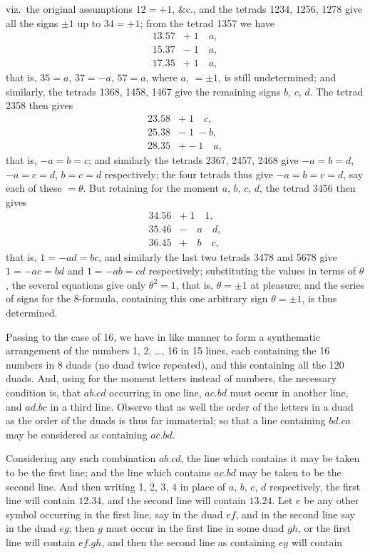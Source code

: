 \documentclass[11pt,a4paper,english]{article}
\theoremstyle{plain}
\begin{document}
\newpage
viz.\ the original assumptions $12 = +1$, \&c., and the tetrads 1234, 1256, 1278 give all the signs $\pm 1$ up to $34 = +1$; from the tetrad 1357 we have
\begin{align*}
13.57 &+ \; 1 \quad a, \\
15.37 &- \; 1 \quad a, \\
17.35 &+ \; 1 \quad a,
\end{align*}
that is, $35 = a$, $37 = -a$, $57 = a$, where $a$, $= \pm 1$, is still undetermined; and similarly, the tetrads 1368, 1458, 1467 give the remaining signs $b$, $c$, $d$. The tetrad 2358 then gives
\begin{align*}
23.58 &+ \; 1 \quad c, \\
25.38 &- \; 1 \; -b, \\
28.35 &+ -1 \quad a,
\end{align*}
that is, $-a = b = c$; and similarly the tetrads 2367, 2457, 2468 give $-a = b = d$, $-a = c = d$, $b = c = d$ respectively; the four tetrads thus give $-a = b = c = d$, say each of these $= \theta$. But retaining for the moment $a$, $b$, $c$, $d$, the tetrad 3456 then gives
\begin{align*}
34.56 &+ \; 1 \quad 1, \\
35.46 &- \quad a \quad d, \\
36.45 &+ \quad b \quad c,
\end{align*}
that is, $1 = -ad = bc$, and similarly the last two tetrads 3478 and 5678 give $1 = -ac = bd$ and $1 = -ab = cd$ respectively; substituting the values in terms of $\theta$, the several equations give only $\theta^2 = 1$, that is, $\theta = \pm 1$ at pleasure; and the series of signs for the 8-formula, containing this one arbitrary sign $\theta = \pm 1$, is thus determined.

Passing to the case of 16, we have in like manner to form a synthematic arrangement of the numbers 1, 2, \ldots, 16 in 15 lines, each containing the 16 numbers in 8 duads (no duad twice repeated), and this containing all the 120 duads. And, using for the moment letters instead of numbers, the necessary condition is, that $ab.cd$ occurring in one line, $ac.bd$ must occur in another line, and $ad.bc$ in a third line. Observe that as well the order of the letters in a duad as the order of the duads is thus far immaterial; so that a line containing $bd.ca$ may be considered as containing $ac.bd$.

Considering any such combination $ab.cd$, the line which contains it may be taken to be the first line; and the line which contains $ac.bd$ may be taken to be the second line. And then writing 1, 2, 3, 4 in place of $a$, $b$, $c$, $d$ respectively, the first line will contain $12.34$, and the second line will contain $13.24$. Let $e$ be any other symbol occurring in the first line, say in the duad $ef$, and in the second line say in the duad $eg$; then $g$ must occur in the first line in some duad $gh$, or the first line will contain $ef.gh$, and then the second line as containing $eg$ will contain
\end{document}
